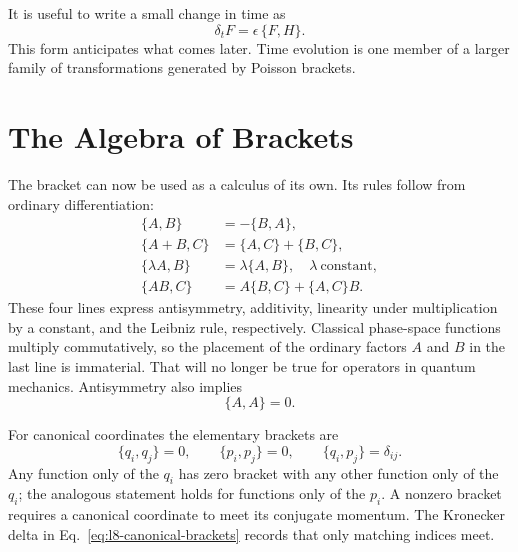 \begin{classroomqa}
\end{classroomqa}

It is useful to write a small change in time as
\begin{equation}
  \delta_t F=\epsilon\,\{F,H\}.
  \label{eq:l8-small-time-step}
\end{equation}
This form anticipates what comes later.  Time evolution is one member of a
larger family of transformations generated by Poisson brackets.

\section{The Algebra of Brackets}

The bracket can now be used as a calculus of its own.  Its rules follow from
ordinary differentiation:
\begin{align}
  \{A,B\}&=-\{B,A\}, \label{eq:l8-antisymmetry}\\
  \{A+B,C\}&=\{A,C\}+\{B,C\}, \label{eq:l8-additivity}\\
  \{\lambda A,B\}&=\lambda\{A,B\},
    \quad \lambda\ \text{constant}, \label{eq:l8-scalar-rule}\\
  \{AB,C\}&=A\{B,C\}+\{A,C\}B. \label{eq:l8-leibniz}
\end{align}
These four lines express antisymmetry, additivity, linearity under multiplication
by a constant, and the Leibniz rule, respectively.
Classical phase-space functions multiply commutatively, so the placement of
the ordinary factors \(A\) and \(B\) in the last line is immaterial.  That
will no longer be true for operators in quantum mechanics.  Antisymmetry also
implies
\begin{equation}
  \{A,A\}=0.
  \label{eq:l8-self-bracket}
\end{equation}

For canonical coordinates the elementary brackets are
\begin{equation}
  \boxed{
  \{q_i,q_j\}=0,\qquad
  \{p_i,p_j\}=0,\qquad
  \{q_i,p_j\}=\delta_{ij}.}
  \label{eq:l8-canonical-brackets}
\end{equation}
Any function only of the \(q_i\) has zero bracket with any other function only
of the \(q_i\); the analogous statement holds for functions only of the
\(p_i\).  A nonzero bracket requires a canonical coordinate to meet its
conjugate momentum.  The Kronecker delta in
Eq.~\eqref{eq:l8-canonical-brackets} records that only matching indices meet.

